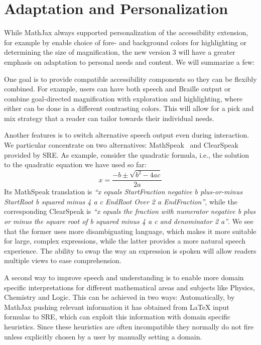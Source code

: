\documentclass{sig-alternate}
\begin{document}
\section{Adaptation and Personalization}
\label{sec:challenges}

While MathJax always supported personalization of the accessibility extension,
for example by enable choice of fore- and background colors for highlighting or
determining the size of magnification, the new version 3 will have a greater
emphasis on adaptation to personal needs and content. We will summarize a few:

 One goal is to provide compatible accessibility
components so they can be flexibly combined.  For example, users can have both
speech and Braille output or combine goal-directed magnification with
exploration and highlighting, where either can be done in a different
contrasting colors. This will allow for a pick and mix strategy that a reader
can tailor towards their individual needs.

 Another features is to switch alternative speech
output even during interaction. We particular concentrate on two alternatives:
MathSpeak~\cite{MathSpeak} and ClearSpeak~\cite{frankel2016development} provided
by SRE. As example, consider the quadratic formula, i.e., the solution to the
quadratic equation we have used so far:
\[x = \frac{-b\pm\sqrt{b^2-4ac}}{2a}\] Its MathSpeak translation is \emph{``x
  equals StartFraction negative b plus-or-minus StartRoot b squared minus 4 a c
  EndRoot Over 2 a EndFraction''}, while the corresponding ClearSpeak is
\emph{``x equals the fraction with numerator negative b plus or minus the square
  root of b squared minus 4 a c and denominator 2 a''}.  We see that the former
uses more disambiguating language, which makes it more suitable for large,
complex expressions, while the latter provides a more natural speech experience.
The ability to swap the way an expression is spoken will allow readers multiple
views to ease comprehension.

 A second way to improve speech and
understanding is to enable more domain specific interpretations for different
mathematical areas and subjects like Physics, Chemistry and Logic. This can be
achieved in two ways: Automatically, by MathJax pushing relevant information it
has obtained from {\LaTeX} input formulas to SRE, which can exploit this
information with domain specific heuristics. Since these heuristics are often
incompatible they normally do not fire unless explicitly chosen by a user by
manually setting a domain.
\end{document}
